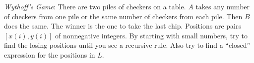 \emph{Wythoff's Game}: There are two piles of checkers on a table. $A$ takes any number of checkers from one pile or the same number of checkers from each pile. Then $B$ does the same. The winner is the one to take the last chip. Positions are pairs $[x(i), y(i)]$ of nonnegative integers. By starting with small numbers, try to find the losing positions until you see a recursive rule. Also try to find a ``closed'' expression for the positions in $L$.
